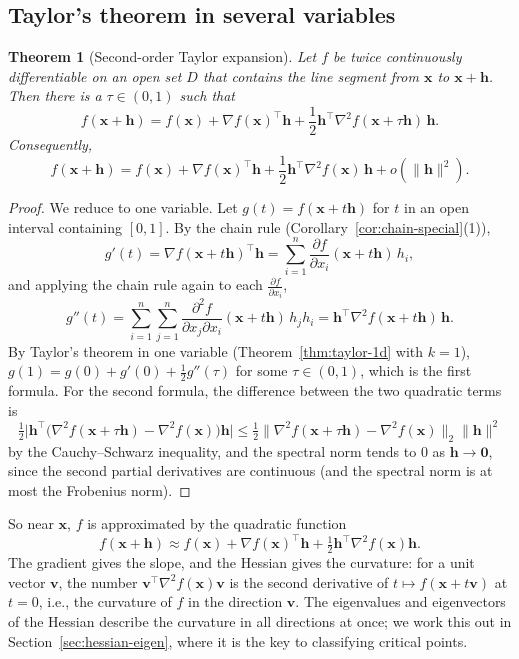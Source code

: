 \documentclass[11pt]{article}
\newcommand{\norm}[1]{\lVert #1 \rVert}
\theoremstyle{definition}
\theoremstyle{plain}
\newtheorem{theorem}[definition]{Theorem}
\theoremstyle{remark}
\begin{document}
\subsection{Taylor's theorem in several variables}

\begin{theorem}[Second-order Taylor expansion]\label{thm:taylor2}
    Let $f$ be twice continuously differentiable on an open set $D$ that contains the line segment from $\mathbf{x}$ to $\mathbf{x} + \mathbf{h}$. Then there is a $\tau \in (0, 1)$ such that
    \[f(\mathbf{x} + \mathbf{h}) = f(\mathbf{x}) + \nabla f(\mathbf{x})^\top \mathbf{h} + \frac{1}{2}\mathbf{h}^\top \nabla^2 f(\mathbf{x} + \tau\mathbf{h}) \, \mathbf{h}.\]
    Consequently,
    \[f(\mathbf{x} + \mathbf{h}) = f(\mathbf{x}) + \nabla f(\mathbf{x})^\top \mathbf{h} + \frac{1}{2}\mathbf{h}^\top \nabla^2 f(\mathbf{x}) \, \mathbf{h} + o(\norm{\mathbf{h}}^2).\]
\end{theorem}

\begin{proof}
    We reduce to one variable. Let $g(t) = f(\mathbf{x} + t\mathbf{h})$ for $t$ in an open interval containing $[0, 1]$. By the chain rule (Corollary~\ref{cor:chain-special}(1)),
    \[g'(t) = \nabla f(\mathbf{x} + t\mathbf{h})^\top \mathbf{h} = \sum_{i=1}^n \frac{\partial f}{\partial x_i}(\mathbf{x} + t\mathbf{h}) \, h_i,\]
    and applying the chain rule again to each $\frac{\partial f}{\partial x_i}$,
    \[g''(t) = \sum_{i=1}^n \sum_{j=1}^n \frac{\partial^2 f}{\partial x_j \partial x_i}(\mathbf{x} + t\mathbf{h}) \, h_j h_i = \mathbf{h}^\top \nabla^2 f(\mathbf{x} + t\mathbf{h}) \, \mathbf{h}.\]
    By Taylor's theorem in one variable (Theorem~\ref{thm:taylor-1d} with $k = 1$), $g(1) = g(0) + g'(0) + \frac{1}{2}g''(\tau)$ for some $\tau \in (0, 1)$, which is the first formula. For the second formula, the difference between the two quadratic terms is
    \[\tfrac{1}{2}\big|\mathbf{h}^\top \big(\nabla^2 f(\mathbf{x} + \tau\mathbf{h}) - \nabla^2 f(\mathbf{x})\big)\mathbf{h}\big| \leq \tfrac{1}{2}\norm{\nabla^2 f(\mathbf{x} + \tau\mathbf{h}) - \nabla^2 f(\mathbf{x})}_2 \norm{\mathbf{h}}^2\]
    by the Cauchy--Schwarz inequality, and the spectral norm tends to $0$ as $\mathbf{h} \to \mathbf{0}$, since the second partial derivatives are continuous (and the spectral norm is at most the Frobenius norm).
\end{proof}

So near $\mathbf{x}$, $f$ is approximated by the quadratic function
\[f(\mathbf{x} + \mathbf{h}) \approx f(\mathbf{x}) + \nabla f(\mathbf{x})^\top \mathbf{h} + \tfrac{1}{2}\mathbf{h}^\top \nabla^2 f(\mathbf{x})\mathbf{h}.\]
The gradient gives the slope, and the Hessian gives the curvature: for a unit vector $\mathbf{v}$, the number $\mathbf{v}^\top \nabla^2 f(\mathbf{x})\mathbf{v}$ is the second derivative of $t \mapsto f(\mathbf{x} + t\mathbf{v})$ at $t = 0$, i.e., the curvature of $f$ in the direction $\mathbf{v}$. The eigenvalues and eigenvectors of the Hessian describe the curvature in all directions at once; we work this out in Section~\ref{sec:hessian-eigen}, where it is the key to classifying critical points.
\end{document}

